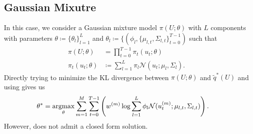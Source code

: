 \documentclass[twoside,11pt]{article}
\begin{document}
\subsection{Gaussian Mixutre}
In this case, we consider a Gaussian mixture model $\pi(U; \theta)$ with $L$ components
with parameters $\theta \coloneqq \{ \theta_l \}_{l=1}^{L}$ and $\theta_l \coloneqq \{ (\phi_l, \{ \mu_{l, t}, \Sigma_{l, t} \}_{t=0}^{T-1} )$ such that
\begin{align}
    \pi(U; \theta) &= \prod_{t=0}^{T-1} \pi_t(u_t; \theta) \\
    \pi_t(u_t; \theta) &\coloneqq \sum_{l=1}^L \pi_l \mathcal{N}(u_t; \mu_l, \Sigma_l).
\end{align}
Directly trying to minimize the KL divergence between $\pi(U; \theta)$ and $\tilde{q}^*(U)$ and using  gives us
\begin{align}
    \theta^*
    &= \argmax_\theta \sum_{m=1}^M \sum_{t=0}^{T-1} \left( w^{(m)} \log \sum_{l=1}^L \phi_l \mathcal{N}(u_t^{(m)}; \mu_{l, t}, \Sigma_{l, t}) \right). \label{eq:gmm_em_argmax}
\end{align}
However,  does not admit a closed form solution. 
\end{document}
